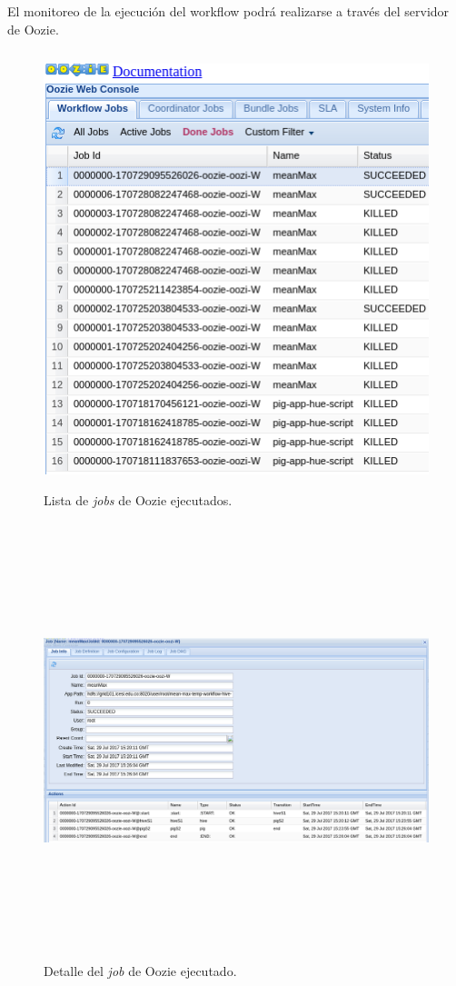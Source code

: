 El monitoreo de la ejecución del workflow podrá realizarse a través del servidor de Oozie.

\begin{figure}[H]
  \centering
      \includegraphics[width=\textwidth, height=5.0in]{fig/06/01}
  \caption{Lista de \textit{jobs} de Oozie ejecutados.}
\end{figure}

\begin{figure}[H]
  \centering
      \includegraphics[width=\textwidth, height=5.0in]{fig/06/02}
  \caption{Detalle del \textit{job} de Oozie ejecutado.}
\end{figure}

